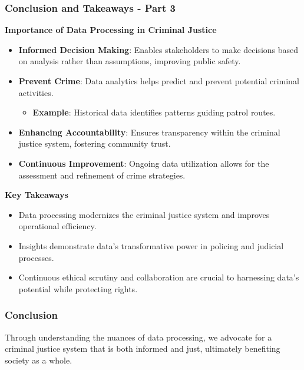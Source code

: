 \documentclass[aspectratio=169]{beamer}
\begin{document}
\begin{frame}[fragile]
    \frametitle{Conclusion and Takeaways - Part 3}

    \textbf{Importance of Data Processing in Criminal Justice}
    
    \begin{itemize}
        \item \textbf{Informed Decision Making}: Enables stakeholders to make decisions based on analysis rather than assumptions, improving public safety.
        \item \textbf{Prevent Crime}: Data analytics helps predict and prevent potential criminal activities.
            \begin{itemize}
                \item \textbf{Example}: Historical data identifies patterns guiding patrol routes.
            \end{itemize}
        \item \textbf{Enhancing Accountability}: Ensures transparency within the criminal justice system, fostering community trust.
        \item \textbf{Continuous Improvement}: Ongoing data utilization allows for the assessment and refinement of crime strategies.
    \end{itemize}

    \textbf{Key Takeaways}
    
    \begin{itemize}
        \item Data processing modernizes the criminal justice system and improves operational efficiency.
        \item Insights demonstrate data’s transformative power in policing and judicial processes.
        \item Continuous ethical scrutiny and collaboration are crucial to harnessing data's potential while protecting rights.
    \end{itemize}

\end{frame}

\begin{frame}[fragile]
    \frametitle{Conclusion}
    
    Through understanding the nuances of data processing, we advocate for a criminal justice system that is both informed and just, ultimately benefiting society as a whole.
    
\end{frame}
\end{document}
